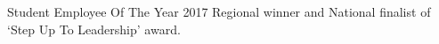 \begin{tightemize}
  \item Student Employee Of The Year 2017 Regional winner and National finalist of `Step Up To Leadership' award.
\end{tightemize}
\sectionsep{}
\vfill{}